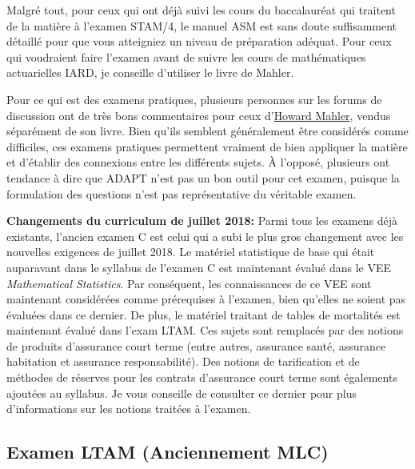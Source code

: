 Malgré tout, pour ceux qui ont déjà suivi les cours du baccalauréat qui traitent de la matière à l'examen STAM/4, le manuel ASM est sans doute suffisamment détaillé pour que vous atteigniez un niveau de préparation adéquat. Pour ceux qui voudraient faire l'examen avant de suivre les cours de mathématiques actuarielles IARD, je conseille d'utiliser le livre de Mahler.\vspace{\baselineskip}

Pour ce qui est des examens pratiques, plusieurs personnes sur les forums de discussion ont de très bons commentaires pour ceux d'\href{http://howardmahler.com/Teaching/C.html}{Howard Mahler}, vendus séparément de son livre. Bien qu'ils semblent généralement être considérés comme difficiles, ces examens pratiques permettent vraiment de bien appliquer la matière et d'établir des connexions entre les différents sujets. À l'opposé, plusieurs ont tendance à dire que ADAPT n'est pas un bon outil pour cet examen, puisque la formulation des questions n'est pas représentative du véritable examen. \vspace{\baselineskip}

\textbf{Changements du curriculum de juillet 2018:} Parmi tous les examens déjà existants, l'ancien examen C est celui qui a subi le plus gros changement avec les nouvelles exigences de juillet 2018. Le matériel statistique de base qui était auparavant dans le syllabus de l'examen C est maintenant évalué dans le VEE \textit{Mathematical Statistics}. Par conséquent, les connaissances de ce VEE sont maintenant considérées comme prérequises à l'examen, bien qu'elles ne soient pas évaluées dans ce dernier. De plus, le matériel traitant de tables de mortalités est maintenant évalué dans l'exam LTAM. Ces sujets sont remplacés par des notions de produits d'assurance court terme (entre autres, assurance santé, assurance habitation et assurance responsabilité). Des notions de tarification et de méthodes de réserves pour les contrats d'assurance court terme sont égalements ajoutées au syllabus. Je vous conseille de consulter ce dernier pour plus d'informations sur les notions traitées à l'examen. \vspace{\baselineskip}

\newpage


\subsection*{Examen LTAM (Anciennement MLC)}
\label{subsec:examltam}

